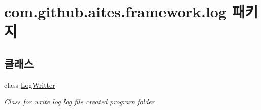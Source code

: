 \hypertarget{namespacecom_1_1github_1_1aites_1_1framework_1_1log}{}\section{com.\+github.\+aites.\+framework.\+log 패키지}
\label{namespacecom_1_1github_1_1aites_1_1framework_1_1log}
\subsection*{클래스}
\begin{DoxyCompactItemize}
\item 
class \mbox{\hyperlink{classcom_1_1github_1_1aites_1_1framework_1_1log_1_1_log_writter}{Log\+Writter}}
\begin{DoxyCompactList}\small\item\em Class for write log log file created program folder \end{DoxyCompactList}\end{DoxyCompactItemize}
